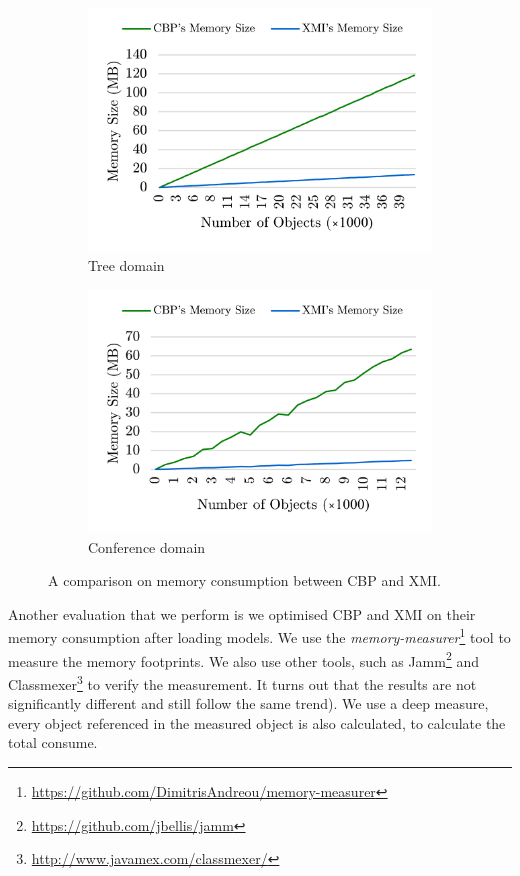 \documentclass{llncs}
\begin{document}
\begin{figure}	
	\begin{subfigure}[t]{0.5\linewidth}
		\includegraphics[width=\linewidth]{memory_use_tree}
		\caption{Tree domain}\label{fig:append_speed_tree}		
	\end{subfigure}
	\hfill
	\begin{subfigure}[t]{0.5\linewidth}
		\includegraphics[width=\linewidth]{memory_use_conf}
		\caption{Conference domain}\label{fig:append_speed_conference}
	\end{subfigure}
	\caption{A comparison on memory consumption between CBP and XMI.}
	\label{fig:memory_use}
\end{figure}

Another evaluation that we perform is we optimised CBP and XMI on their memory consumption after loading models. We use the \emph{memory-measurer}\footnote{\url{https://github.com/DimitrisAndreou/memory-measurer}} tool to measure the memory footprints. We also use other tools, such as Jamm\footnote{\url{https://github.com/jbellis/jamm}} and Classmexer\footnote{\url{http://www.javamex.com/classmexer/}} to verify the measurement. It turns out that the results are not significantly different and still follow the same trend). We use a deep measure, every object referenced in the measured object is also calculated, to calculate the total consume. 
\end{document}
